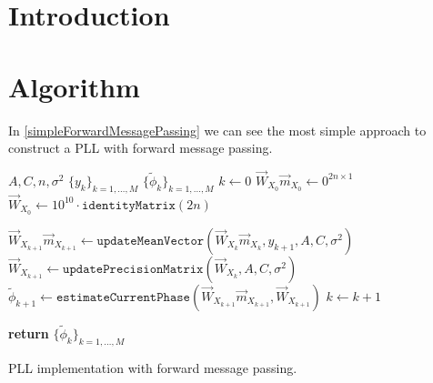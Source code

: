 \section{Introduction}

\section{Algorithm}

In \ref{simpleForwardMessagePassing} we can see the most simple approach to construct a PLL with forward message passing.

\begin{algorithm}
\label{simpleForwardMessagePassing}
\begin{algorithmic}[1]
\Parameters $ A, C, n, \sigma^2$
\Require $\{y_k\}_{k=1, \ldots, M}$
\Ensure $\{\tilde{\phi}_k\}_{k=1,\ldots, M}$
\State $k \gets 0$
\State $\overrightarrow{W}_{X_0}\overrightarrow{m}_{X_0} \gets  0^{2n \times 1} $
\State $\overrightarrow{W}_{X_0} \gets  10^{10} \cdot \texttt{identityMatrix}(2n) $

\State $\overrightarrow{W}_{X_{k+1}}\overrightarrow{m}_{X_{k+1}} \gets \texttt{updateMeanVector}(\overrightarrow{W}_{X_k}\overrightarrow{m}_{X_k},y_{k+1},A,C,\sigma^2)$
\State $\overrightarrow{W}_{X_{k+1}} \gets \texttt{updatePrecisionMatrix}(\overrightarrow{W}_{X_k},A,C,\sigma^2)$
\State $\tilde{\phi}_{k+1} \gets \texttt{estimateCurrentPhase}(\overrightarrow{W}_{X_{k+1}}\overrightarrow{m}_{X_{k+1}},\overrightarrow{W}_{X_{k+1}})$
\State $k \gets k+1$
\EndFor

\State \textbf{return} $\{\tilde{\phi}_k\}_{k=1,\ldots, M}$
\end{algorithmic}
\caption[Simple PLL implementation.]
{PLL implementation with forward message passing.}
\end{algorithm}




\clearpage